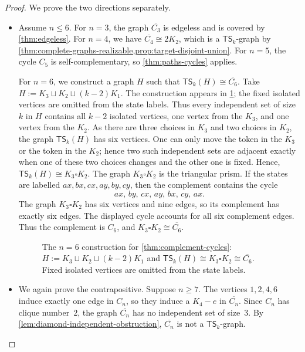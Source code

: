 \documentclass[a4paper]{article}
\theoremstyle{plain}
\theoremstyle{definition}
\newcommand{\TSsym}{\mathsf{TS}}
\numberwithin{equation}{section}
\begin{document}
\begin{proof}
We prove the two directions separately.
\begin{itemize}
\item[$(\Leftarrow)$]
Assume $n\le 6$.
For $n=3$, the graph $\overline{C_3}$ is edgeless and is covered by \cref{thm:edgeless}.
For $n=4$, we have $\overline{C_4}\cong 2K_2$, which is a $\TSsym_k$-graph by \cref{thm:complete-graphs-realizable,prop:target-disjoint-union}.
For $n=5$, the cycle $C_5$ is self-complementary, so \cref{thm:paths-cycles} applies.

For $n=6$, we construct a graph $H$ such that $\TSsym_k(H)\cong\overline{C_6}$.
Take $H:=K_3\sqcup K_2\sqcup (k-2)K_1$.
The construction appears in \cref{fig:c6-realization}; the fixed isolated vertices are omitted from the state labels.
Thus every independent set of size $k$ in $H$ contains all $k-2$ isolated vertices, one vertex from the $K_3$, and one vertex from the $K_2$.
As there are three choices in $K_3$ and two choices in $K_2$, the graph $\TSsym_k(H)$ has six vertices.
One can only move the token in the $K_3$ or the token in the $K_2$; hence two such independent sets are adjacent exactly when one of these two choices changes and the other one is fixed.
Hence, $\TSsym_k(H)\cong K_3\square K_2$.
The graph $K_3\square K_2$ is the triangular prism.
If the states are labelled $ax,bx,cx,ay,by,cy$, then the complement contains the cycle
\[
ax,\,by,\,cx,\,ay,\,bx,\,cy,\,ax.
\]
The graph $K_3\square K_2$ has six vertices and nine edges, so its complement has exactly six edges.
The displayed cycle accounts for all six complement edges.
Thus the complement is $C_6$, and $K_3\square K_2\cong \overline{C_6}$.

\begin{figure}[ht]
\centering

\caption{The $n=6$ construction for \cref{thm:complement-cycles}: $H:=K_3\sqcup K_2\sqcup (k-2)K_1$ and $\TSsym_k(H)\cong K_3\square K_2\cong\overline{C_6}$. Fixed isolated vertices are omitted from the state labels.}
\label{fig:c6-realization}
\end{figure}

\item[$(\Rightarrow)$]
We again prove the contrapositive.
Suppose $n\ge 7$.
The vertices $1,2,4,6$ induce exactly one edge in $C_n$, so they induce a $K_4-e$ in $\overline{C_n}$.
Since $C_n$ has clique number~$2$, the graph $\overline{C_n}$ has no independent set of size~$3$.
By \cref{lem:diamond-independent-obstruction}, $\overline{C_n}$ is not a $\TSsym_k$-graph.
\end{itemize}
\end{proof}
\end{document}
